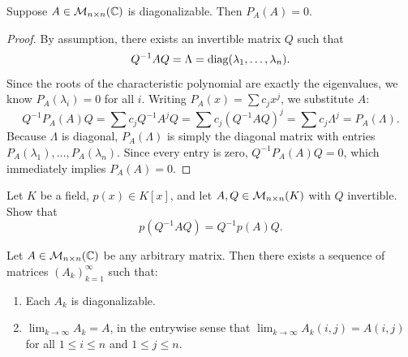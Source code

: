 \begin{lemma}
  \label{lemma:cayley_diagonalizable}
  Suppose $A \in \mathcal{M}_{n \times n}(\mathbb{C})$ is diagonalizable. Then $P_A(A) = 0$.
\end{lemma}

\begin{proof}
  By assumption, there exists an invertible matrix $Q$ such that 
  \[Q^{-1} A Q = \Lambda = \operatorname{diag}(\lambda_1, \dots, \lambda_n). \] 
  Since the roots of the characteristic polynomial are exactly the eigenvalues, we know $P_A(\lambda_i) = 0$ for all $i$. Writing $P_A(x) = \sum c_j x^j$, we substitute $A$:
  \[
  Q^{-1} P_A(A) Q = \sum c_j Q^{-1} A^j Q = \sum c_j (Q^{-1} A Q)^j = \sum c_j \Lambda^j = P_A(\Lambda).
  \]
  Because $\Lambda$ is diagonal, $P_A(\Lambda)$ is simply the diagonal matrix with entries $P_A(\lambda_1), \dots, P_A(\lambda_n)$. Since every entry is zero, $Q^{-1} P_A(A) Q = 0$, which immediately implies $P_A(A) = 0$.
\end{proof}

\begin{exercise}
  \label{exc:similarity_of_matrix_polynomials}
  Let $K$ be a field, $p(x) \in K[x]$, and let $A, Q \in \mathcal{M}_{n \times n}(K)$ with $Q$ invertible. Show that
  \[
  p(Q^{-1} A Q) = Q^{-1} p(A) Q.
  \]
\end{exercise}

\begin{lemma}
  \label{lemma:sequence_diagonalizable}
  Let $A \in \mathcal{M}_{n \times n}(\mathbb{C})$ be any arbitrary matrix. Then there exists a sequence of matrices $(A_k)_{k=1}^\infty$ such that:
  \begin{enumerate}[label=\textbf{(\alph*)}]
    \item Each $A_k$ is diagonalizable.
    \item $\lim_{k \to \infty} A_k = A$, in the entrywise sense that $\lim_{k \to \infty} A_k(i,j) = A(i,j)$ for all $1 \le i \le n$ and $1 \le j \le n$.
  \end{enumerate}
\end{lemma}

